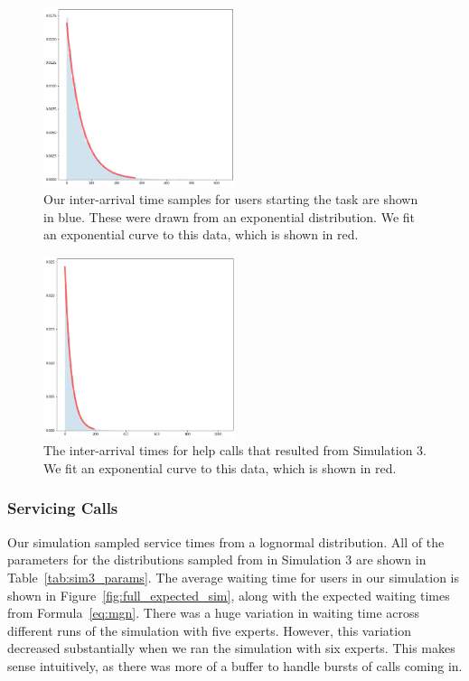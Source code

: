 \begin{figure}[h]
  \includegraphics[width=0.5\textwidth]{figures/montecarlo/arrival_times.png}
  \caption{
    Our inter-arrival time samples for users starting the task are shown in
    blue.
    These were drawn from an exponential distribution.
    We fit an exponential curve to this data, which is shown in red.
  }\label{fig:arrival_times}
\end{figure}

\begin{figure}[h]
  \includegraphics[width=0.5\textwidth]{figures/montecarlo/call_times.png}
  \caption{
    The inter-arrival times for help calls that resulted from Simulation 3.
    We fit an exponential curve to this data, which is shown in red.
  }\label{fig:step_patience}
\end{figure}

\subsubsection{Servicing Calls}

Our simulation sampled service times from a lognormal distribution.
All of the parameters for the distributions sampled from in Simulation 3 are
shown in Table~\ref{tab:sim3_params}.
The average waiting time for users in our simulation is shown in
Figure~\ref{fig:full_expected_sim}, along with the expected waiting times from
Formula~\ref{eq:mgn}.
There was a huge variation in waiting time across different runs of the
simulation with five experts.
However, this variation decreased substantially when we ran the simulation with
six experts.
This makes sense intuitively, as there was more of a buffer to handle bursts of
calls coming in.

